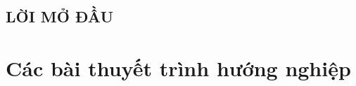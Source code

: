 \documentclass[14pt, a4paper]{article}
\numberwithin{equation}{section}
\numberwithin{figure}{section}
\numberwithin{dl}{section}
\numberwithin{md}{section}
\numberwithin{bd}{section}
\numberwithin{dn}{section}
\numberwithin{hq}{section}
\begin{document}
\begin{titlepage}





        \vfill %

    \end{titlepage}

    \cleardoublepage
    \tableofcontents
    \newpage
    \listoffigures
    \newpage
    \glsaddall 
    \renewcommand*{\glossaryname}{Danh mục các từ viết tắt}
    \renewcommand*{\acronymname}{Danh sách từ viết tắt}
    \renewcommand*{\entryname}{Viết tắt}
    \renewcommand*{\descriptionname}{Viết đầy đủ}
    \printnoidxglossary
    \cleardoublepage


    \newpage

    \nocite{*}

    \begin{center}
    \section*{LỜI MỞ ĐẦU}
    \end{center}

    \newpage

    \section{Các bài thuyết trình hướng nghiệp}
\end{document}
